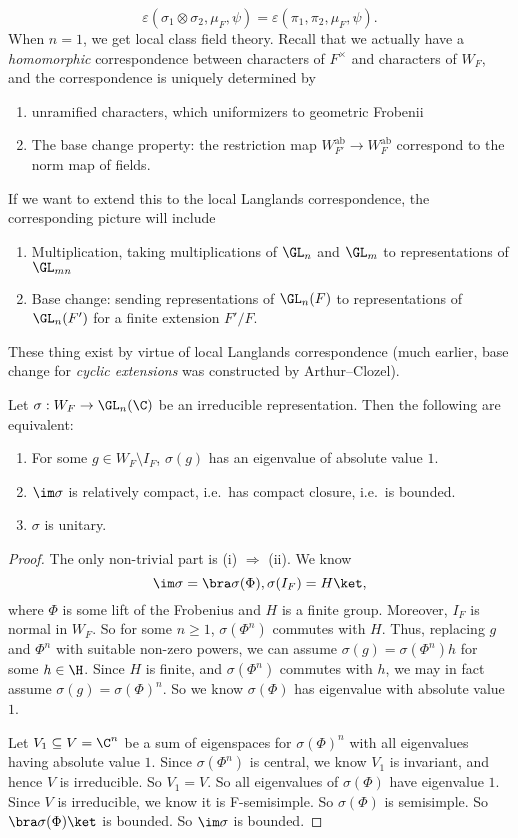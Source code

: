 \documentclass[a4paper]{article}
\newcommand\ab{\mathrm{ab}}
\begin{document}
\[
  \varepsilon(\sigma_1 \otimes \sigma_2, \mu_F, \psi) = \varepsilon(\pi_1, \pi_2, \mu_F, \psi).
\]
When $n = 1$, we get local class field theory. Recall that we actually have a \emph{homomorphic} correspondence between characters of $F^\times$ and characters of $W_F$, and the correspondence is uniquely determined by
\begin{enumerate}
  \item unramified characters, which uniformizers to geometric Frobenii
  \item The base change property: the restriction map $W_{F'}^{\ab} \to W_F^{\ab}$ correspond to the norm map of fields.
\end{enumerate}
If we want to extend this to the local Langlands correspondence, the corresponding picture will include
\begin{enumerate}
  \item Multiplication, taking multiplications of $\GL_n$ and $\GL_m$ to representations of $\GL_{mn}$
  \item Base change: sending representations of $\GL_n(F)$ to representations of $\GL_n(F')$ for a finite extension $F'/F$.
\end{enumerate}
These thing exist by virtue of local Langlands correspondence (much earlier, base change for \emph{cyclic extensions} was constructed by Arthur--Clozel). %

\begin{prop}
  Let $\sigma: W_F \to \GL_n(\C)$ be an irreducible representation. Then the following are equivalent:
  \begin{enumerate}
    \item For some $g \in W_F \setminus I_F$, $\sigma(g)$ has an eigenvalue of absolute value $1$.
    \item $\im \sigma$ is relatively compact, i.e.\ has compact closure, i.e.\ is bounded.
    \item $\sigma$ is unitary.
  \end{enumerate}
\end{prop}

\begin{proof}
  The only non-trivial part is (i) $\Rightarrow$ (ii). We know
  \[
    \im \sigma = \bra \sigma(\Phi), \sigma(I_F) = H\ket,
  \]
  where $\Phi$ is some lift of the Frobenius and $H$ is a finite group. Moreover, $I_F$ is normal in $W_F$. So for some $n \geq 1$, $\sigma(\Phi^n)$ commutes with $H$. Thus, replacing $g$ and $\Phi^n$ with suitable non-zero powers, we can assume $\sigma(g) = \sigma(\Phi^n) h$ for some $h \in \H$. Since $H$ is finite, and $\sigma(\Phi^n)$ commutes with $h$, we may in fact assume $\sigma(g) = \sigma(\Phi)^n$. So we know $\sigma(\Phi)$ has eigenvalue with absolute value $1$.

  Let $V_1 \subseteq V = \C^n$ be a sum of eigenspaces for $\sigma(\Phi)^n$ with all eigenvalues having absolute value $1$. Since $\sigma(\Phi^n)$ is central, we know $V_1$ is invariant, and hence $V$ is irreducible. So $V_1 = V$. So all eigenvalues of $\sigma(\Phi)$ have eigenvalue $1$. Since $V$ is irreducible, we know it is F-semisimple. So $\sigma(\Phi)$ is semisimple. So $\bra \sigma(\Phi)\ket$ is bounded. So $\im \sigma$ is bounded.
\end{proof}
\end{document}
